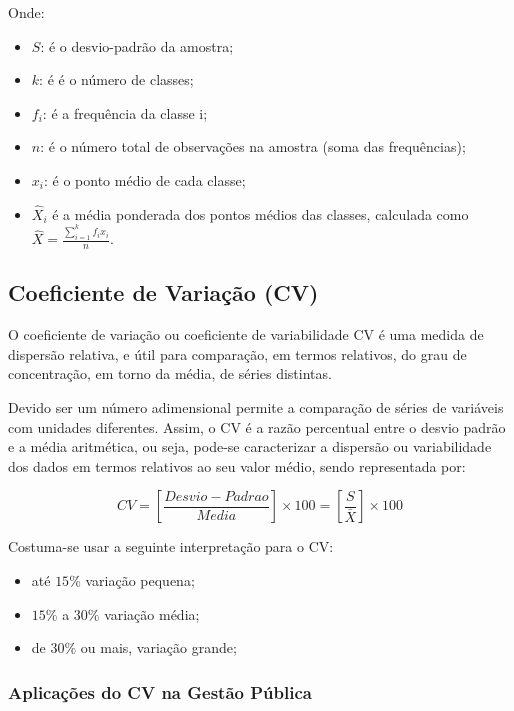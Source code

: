 Onde:

\begin{itemize}
    \item $S$: é o desvio-padrão da amostra;
    \item $k$: é é o número de classes;
    \item $f_{i}$: é a frequência da classe i;
    \item $n$: é o número total de observações na amostra (soma das frequências);
    \item $x_{i}$: é o ponto médio de cada classe;
    \item $\hat{X}_{i}$ é a média ponderada dos pontos médios das classes, calculada como $\hat{X} = \frac{\sum_{i=1}^{k} f_{i} x_{i}}{n}$.
\end{itemize}
\vskip0.3cm

\newpage
\subsection{Coeficiente de Variação (CV)}

O coeficiente de variação ou coeficiente de variabilidade CV é uma medida de dispersão relativa, e útil para comparação, em termos relativos, do grau de concentração, em torno da média, de séries distintas.\vskip0.3cm 

Devido ser um número adimensional permite a comparação de séries de variáveis com unidades diferentes. Assim, o CV é a razão percentual entre o desvio padrão e a média aritmética, ou seja, pode-se caracterizar a dispersão ou variabilidade dos dados em termos relativos ao seu valor médio, sendo representada por:


\begin{equation}\label{CV}
    CV =  \left[ \frac{Desvio-Padrao}{Media} \right] \times 100 = \left[ \frac{S}{\bar{X}} \right]  \times 100
\end{equation}

Costuma-se usar a seguinte interpretação para o CV:

\begin{itemize}
\item até $15\%$ variação pequena;
\item $15\%$ a $30\%$ variação média;
\item de $30\%$ ou mais, variação grande; 
\end{itemize}

\subsubsection{Aplicações do CV na Gestão Pública} 

